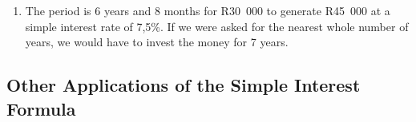 {\begin{mdframed}[linewidth=4, leftmargin=40, rightmargin=40]
\begin{exercise}
\begin{enumerate}[noitemsep, label=\textbf{Step} \textbf{\arabic*}. ]
{\begin{minipage}{\columnwidth}
    \parbox[t]{\mymathboxwidth}{\large\begin{math}
    A=P\left(1+i\ensuremath{\cdot}n\right)R45\phantom{\rule{3.33333pt}{0ex}}000=R30\phantom{\rule{3.33333pt}{0ex}}000\left(1+n\ensuremath{\times}7,5\%\right)\left(1+0,075\ensuremath{\times}n\right)=\frac{45000}{30000}0,075\ensuremath{\times}n=1,5-1n=\frac{0,5}{0,075}n=6,6666667n=6\phantom{\rule{1mm}{0ex}}\mathrm{years}\phantom{\rule{1mm}{0ex}}8\phantom{\rule{1mm}{0ex}}\mathrm{months}\end{math}}\hfill
    \parbox[t]{48pt}{\raggedleft 
    (3.11)}
    \end{minipage}\vspace{12pt}\par
    }%
    
        
        \item  
        
        \label{m39332*id70878}The period is 6 years and 8 months for R30~000 to generate R45~000 at a simple interest rate of 7,5\%. If we were asked for the nearest whole number of years, we would have to invest the money for 7 years.\par 
        \end{enumerate}
         

    \end{exercise}
    \end{mdframed}
    }
    \noindent
  
      
      \label{m39332*uid41}
            \subsection{ Other Applications of the Simple Interest Formula}
            \nopagebreak
            
        
\par
            \label{m39332*secfhsst!!!underscore!!!id1464}\vspace{.5cm} 
      
